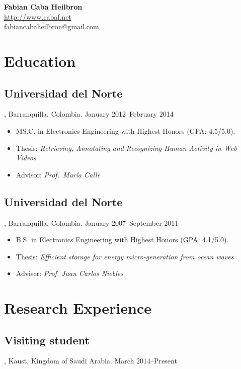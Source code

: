 \documentclass[letterpaper,10pt]{article}
\begin{document}
\begin{center}
  \Large 
  \textbf{Fabian Caba Heilbron} \\[1ex]
  \normalsize
  \url{http://www.cabaf.net} \\
  fabiancabaheilbron@gmail.com
\end{center}


\section{Education}

\subsection{Universidad del Norte}, Barranquilla, Colombia. \hfill January 2012--February 2014 

\begin{itemize}
  \item MS.C. in Electronics Engineering with Highest Honors (GPA: 4.5/5.0).
  \item Thesis:  \emph{Retrieving, Annotating and Recognizing Human Activity in Web Videos}
  \item Advisor:  \emph{Prof.~Mar\'ia Calle} \\
  
\end{itemize}

\subsection{Universidad del Norte}, Barranquilla, Colombia. \hfill January 2007--September 2011 

\begin{itemize}
  \item B.S. in Electronics Engineering with Highest Honors (GPA: 4.1/5.0).
  \item Thesis:  \emph{Efficient storage for energy micro-generation from ocean waves}
  \item Adviser:  \emph{Prof. Juan Carlos Niebles} \\
\end{itemize}

\section{Research Experience}

\subsection{Visiting student}, Kaust, Kingdom of Saudi Arabia. \hfill March 2014--Present
\end{document}
